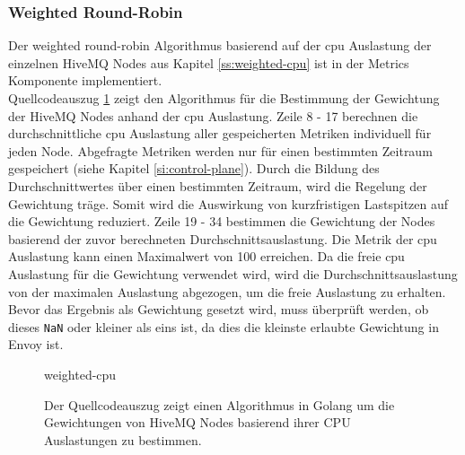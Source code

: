 \subsubsection{Weighted Round-Robin}
Der weighted round-robin Algorithmus basierend auf der \ac{cpu} Auslastung der einzelnen HiveMQ Nodes aus Kapitel \ref{ss:weighted-cpu} ist in der Metrics Komponente implementiert.
\\
Quellcodeauszug \ref{code:weighted-cpu} zeigt den Algorithmus für die Bestimmung der Gewichtung der HiveMQ Nodes anhand der \ac{cpu} Auslastung.
Zeile 8 - 17 berechnen die durchschnittliche \ac{cpu} Auslastung aller gespeicherten Metriken individuell für jeden Node. Abgefragte Metriken werden nur für einen bestimmten Zeitraum gespeichert (siehe Kapitel \ref{si:control-plane}). Durch die Bildung des Durchschnittwertes über einen bestimmten Zeitraum, wird die Regelung der Gewichtung träge. Somit wird die Auswirkung von kurzfristigen Lastspitzen auf die Gewichtung reduziert.
Zeile 19 - 34 bestimmen die Gewichtung der Nodes basierend der zuvor berechneten Durchschnittsauslastung. Die Metrik der \ac{cpu} Auslastung kann einen Maximalwert von 100 erreichen. Da die freie \ac{cpu} Auslastung für die Gewichtung verwendet wird, wird die Durchschnittsauslastung von der maximalen Auslastung abgezogen, um die freie Auslastung zu erhalten. Bevor das Ergebnis als Gewichtung gesetzt wird, muss überprüft werden, ob dieses \verb|NaN| oder kleiner als eins ist, da dies die kleinste erlaubte Gewichtung in Envoy ist.
\begin{figure}
    {weighted-cpu}
    \caption{Der Quellcodeauszug zeigt einen Algorithmus in Golang um die Gewichtungen von HiveMQ Nodes basierend ihrer CPU Auslastungen zu bestimmen.}
    \label{code:weighted-cpu}
\end{figure}

